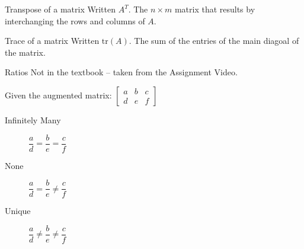 \documentclass[\main/notes.tex]{subfiles}
\begin{document}
				\begin{definition}{Transpose of a matrix}
					Written $A^{T}$. The $n \times m$ matrix that results by interchanging the rows and columns of $A$.
				\end{definition}
				\begin{definition}{Trace of a matrix}
					Written $\mathrm{tr}(A)$. The sum of the entries of the main diagoal of the matrix.
				\end{definition}
				\begin{sidenote}{Ratios}
					Not in the textbook -- taken from the Assignment Video.

					Given the augmented matrix: $ \begin{bmatrix}
						a & b & c\\
						d & e & f
					\end{bmatrix}$

					\begin{description}
						\item[Infinitely Many] $ \dfrac{a}{d} = \dfrac{b}{e} = \dfrac{c}{f}$
						\item[None] $ \dfrac{a}{d} = \dfrac{b}{e} \neq \dfrac{c}{f}$
						\item[Unique] $ \dfrac{a}{d} \neq \dfrac{b}{e} \neq \dfrac{c}{f}$
					\end{description}
				\end{sidenote}

		\pagebreak
\end{document}
